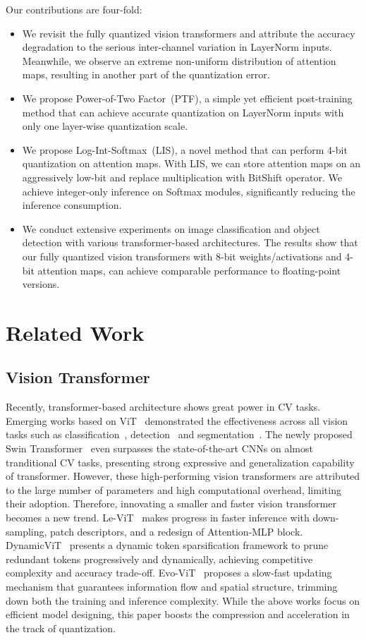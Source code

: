 \documentclass{article}
\begin{document}
Our contributions are four-fold:
\begin{itemize}
    \item We revisit the fully quantized vision transformers and attribute the accuracy degradation to the serious inter-channel variation in LayerNorm inputs. Meanwhile, we observe an extreme non-uniform distribution of attention maps, resulting in another part of the quantization error.
    \item We propose Power-of-Two Factor~(PTF), a simple yet efficient post-training method that can achieve accurate quantization on LayerNorm inputs with only one layer-wise quantization scale.
    \item We propose Log-Int-Softmax~(LIS), a novel method that can perform 4-bit quantization on attention maps. With LIS, we can store attention maps on an aggressively low-bit and replace multiplication with BitShift operator. We achieve integer-only inference on Softmax modules, significantly reducing the inference consumption.
    \item We conduct extensive experiments on image classification and object detection with various transformer-based architectures. The results show that our fully quantized vision transformers with 8-bit weights/activations and 4-bit attention maps, can achieve comparable performance to floating-point versions.
\end{itemize}

\section{Related Work}
\subsection{Vision Transformer}
Recently, transformer-based architecture shows great power in CV tasks. Emerging works based on ViT~\cite{dosovitskiy2021an} demonstrated the effectiveness across all vision tasks such as classification~\cite{touvron2021training}, detection~\cite{carion2020end} and segmentation~\cite{zheng2021rethinking}.
The newly proposed Swin Transformer~\cite{liu2021swin} even surpasses the state-of-the-art CNNs on almost tranditional CV tasks, presenting strong expressive and generalization capability of transformer.
However, these high-performing vision transformers are attributed to the large number of parameters and high computational overhead, limiting their adoption.
Therefore, innovating a smaller and faster vision transformer becomes a new trend.
Le-ViT~\cite{graham2021levit} makes progress in faster inference with down-sampling, patch descriptors, and a redesign of Attention-MLP block. DynamicViT~\cite{rao2021dynamicvit} presents a dynamic token sparsification framework to prune redundant tokens progressively and dynamically, achieving competitive complexity and accuracy trade-off. 
Evo-ViT~\cite{xu2021evo} proposes a slow-fast updating mechanism that guarantees information flow and spatial structure, trimming down both the training and inference complexity.
While the above works focus on efficient model designing, this paper boosts the compression and acceleration in the track of quantization.
\end{document}
